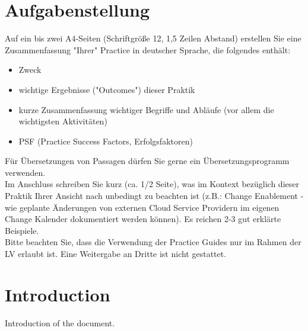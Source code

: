 \section{Aufgabenstellung}
Auf ein bis zwei A4-Seiten (Schriftgröße 12, 1,5 Zeilen Abstand) erstellen Sie eine Zusammenfassung "Ihrer" Practice in deutscher Sprache, die folgendes enthält: 

\begin{itemize}
	\item Zweck
	\item wichtige Ergebnisse ("Outcomes") dieser Praktik 
	\item kurze Zusammenfassung wichtiger Begriffe und Abläufe (vor allem die wichtigsten Aktivitäten)
	\item PSF (Practice Success Factors, Erfolgsfaktoren)
\end{itemize}

\noindent
Für Übersetzungen von Passagen dürfen Sie gerne ein Übersetzungsprogramm verwenden. \\

\noindent
Im Anschluss schreiben Sie kurz (ca. 1/2 Seite), was im Kontext bezüglich dieser Praktik Ihrer Ansicht nach unbedingt zu beachten ist (z.B.: Change Enablement - wie geplante Änderungen von externen Cloud Service Providern im eigenen Change Kalender dokumentiert werden können). Es reichen 2-3 gut erklärte Beispiele. \\

\noindent
Bitte beachten Sie, dass die Verwendung der Practice Guides nur im Rahmen der LV erlaubt ist. Eine Weitergabe an Dritte ist nicht gestattet. 

\section{Introduction}
Introduction of the document.
